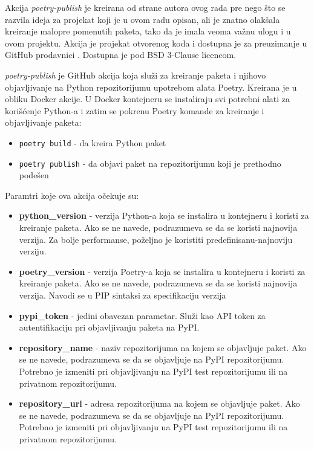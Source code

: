 \documentclass[12pt]{report}
\begin{document}
Akcija \textit{poetry-publish} je kreirana od strane autora ovog rada pre nego što se razvila ideja za projekat koji je u ovom radu opisan, ali je znatno olakšala kreiranje malopre pomenutih paketa, tako da je imala veoma važnu ulogu i u ovom projektu. Akcija je projekat otvorenog koda i dostupna je za preuzimanje u GitHub prodavnici \cite{poetry-publish-marketplace}. Dostupna je pod BSD 3-Clause licencom.

\textit{poetry-publish} je GitHub akcija koja služi za kreiranje paketa i njihovo objavljivanje na Python repozitorijumu upotrebom alata Poetry. Kreirana je u obliku Docker akcije. U Docker kontejneru se instaliraju svi potrebni alati za korišćenje Python-a i zatim se pokrenu Poetry komande za kreiranje i objavljivanje paketa:

\begin{itemize}
    \item \texttt{poetry build} - da kreira Python paket
    \item \texttt{poetry publish} - da objavi paket na repozitorijumu koji je prethodno podešen
\end{itemize}

Paramtri koje ova akcija očekuje su:

\begin{itemize}
    \item \textbf{python\_version} - verzija Python-a koja se instalira u kontejneru i koristi za kreiranje paketa. Ako se ne navede, podrazumeva se da se koristi najnovija verzija. Za bolje performanse, poželjno je koristiti predefinisanu-najnoviju verziju.
    \item \textbf{poetry\_version} - verzija Poetry-a koja se instalira u kontejneru i koristi za kreiranje paketa. Ako se ne navede, podrazumeva se da se koristi najnovija verzija. Navodi se u PIP sintaksi za specifikaciju verzija
    \item \textbf{pypi\_token} - jedini obavezan parametar. Služi kao API token za autentifikaciju pri objavljivanju paketa na PyPI.
    \item \textbf{repository\_name} - naziv repozitorijuma na kojem se objavljuje paket. Ako se ne navede, podrazumeva se da se objavljuje na PyPI repozitorijumu. Potrebno je izmeniti pri objavljivanju na PyPI test repozitorijumu ili na privatnom repozitorijumu.
    \item \textbf{repository\_url} - adresa repozitorijuma na kojem se objavljuje paket. Ako se ne navede, podrazumeva se da se objavljuje na PyPI repozitorijumu. Potrebno je izmeniti pri objavljivanju na PyPI test repozitorijumu ili na privatnom repozitorijumu.
\end{itemize}
\end{document}
